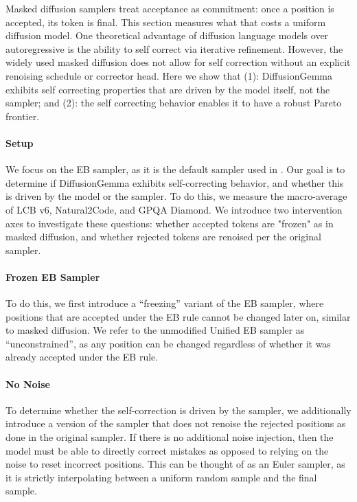 Masked diffusion samplers treat acceptance as commitment: once a position is accepted, its token is final.
This section measures what that costs a uniform diffusion model.
One theoretical advantage of diffusion language models over autoregressive is the ability to self correct via iterative refinement.
However, the widely used masked diffusion does not allow for self correction without an explicit renoising schedule or corrector head.
Here we show that (1): DiffusionGemma exhibits self correcting properties that are driven by the model itself, not the sampler; and (2): the self correcting behavior enables it to have a robust Pareto frontier. 
\paragraph{Setup}
We focus on the EB sampler, as it is the default sampler used in \citet{team2026diffusiongemma}.
Our goal is to determine if DiffusionGemma exhibits self-correcting behavior, and whether this is driven by the model or the sampler.
To do this, we measure the macro-average of LCB v6, Natural2Code, and GPQA Diamond.
We introduce two intervention axes to investigate these questions: whether accepted tokens are "frozen" as in masked diffusion, and whether rejected tokens are renoised per the original sampler.

\paragraph{Frozen EB Sampler}
To do this, we first introduce a ``freezing'' variant of the EB sampler, where positions that are accepted under the EB rule cannot be changed later on, similar to masked diffusion.
We refer to the unmodified Unified EB sampler as ``unconstrained'', as any position can be changed regardless of whether it was already accepted under the EB rule.

\paragraph{No Noise}
To determine whether the self-correction is driven by the sampler, we additionally introduce a version of the sampler that does not renoise the rejected positions as done in the original sampler. 
If there is no additional noise injection, then the model must be able to directly correct mistakes as opposed to relying on the noise to reset incorrect positions.
This can be thought of as an Euler sampler, as it is strictly interpolating between a uniform random sample and the final sample.

